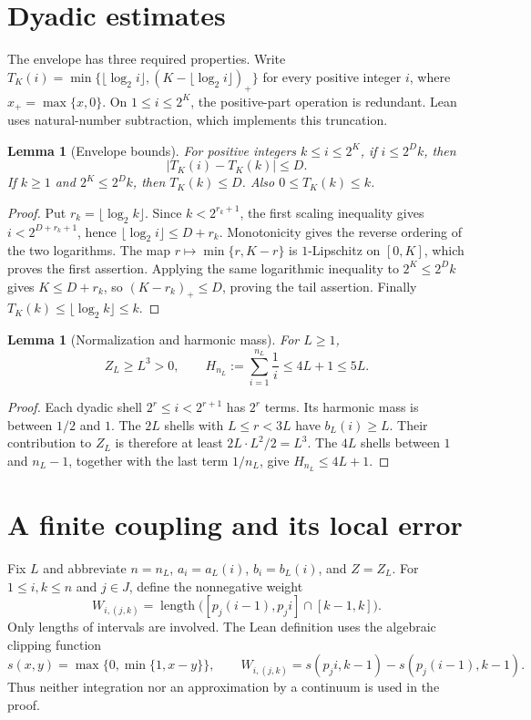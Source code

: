 \documentclass[11pt]{article}
\newtheorem{lemma}[theorem]{Lemma}
\begin{document}
\section{Dyadic estimates}

The envelope has three required properties. Write $T_K(i)=\min\{\lfloor\log_2 i\rfloor,(K-\lfloor\log_2 i\rfloor)_+\}$ for every positive integer $i$, where $x_+=\max\{x,0\}$. On $1\leq i\leq2^K$, the positive-part operation is redundant. Lean uses natural-number subtraction, which implements this truncation.

\begin{lemma}[Envelope bounds]\label{lem:tent}
For positive integers $k\leq i\leq2^K$, if $i\leq2^Dk$, then
\[
 |T_K(i)-T_K(k)|\leq D.
\]
If $k\geq1$ and $2^K\leq2^Dk$, then $T_K(k)\leq D$. Also $0\leq T_K(k)\leq k$.
\end{lemma}
\begin{proof}
Put $r_k=\lfloor\log_2 k\rfloor$. Since $k<2^{r_k+1}$, the first scaling inequality gives $i<2^{D+r_k+1}$, hence $\lfloor\log_2 i\rfloor\leq D+r_k$. Monotonicity gives the reverse ordering of the two logarithms. The map $r\mapsto\min\{r,K-r\}$ is $1$-Lipschitz on $[0,K]$, which proves the first assertion. Applying the same logarithmic inequality to $2^K\leq2^Dk$ gives $K\leq D+r_k$, so $(K-r_k)_+\leq D$, proving the tail assertion. Finally $T_K(k)\leq\lfloor\log_2 k\rfloor\leq k$.
\end{proof}

\begin{lemma}[Normalization and harmonic mass]\label{lem:norm}
For $L\geq1$,
\[
 Z_L\geq L^3>0,
 \qquad H_{n_L}:=\sum_{i=1}^{n_L}\frac1i\leq4L+1\leq5L.
\]
\end{lemma}
\begin{proof}
Each dyadic shell $2^r\leq i<2^{r+1}$ has $2^r$ terms. Its harmonic mass is between $1/2$ and $1$. The $2L$ shells with $L\leq r<3L$ have $b_L(i)\geq L$. Their contribution to $Z_L$ is therefore at least $2L\cdot L^2/2=L^3$. The $4L$ shells between $1$ and $n_L-1$, together with the last term $1/n_L$, give $H_{n_L}\leq4L+1$.
\end{proof}

\section{A finite coupling and its local error}

Fix $L$ and abbreviate $n=n_L$, $a_i=a_L(i)$, $b_i=b_L(i)$, and $Z=Z_L$. For $1\leq i,k\leq n$ and $j\in J$, define the nonnegative weight
\begin{equation}
 W_{i,(j,k)}=
 \operatorname{length}\bigl([p_j(i-1),p_ji]\cap[k-1,k]\bigr).
 \label{eq:coupling}
\end{equation}
Only lengths of intervals are involved. The Lean definition uses the algebraic clipping function
\[
 s(x,y)=\max\{0,\min\{1,x-y\}\},\qquad
 W_{i,(j,k)}=s(p_ji,k-1)-s(p_j(i-1),k-1).
\]
Thus neither integration nor an approximation by a continuum is used in the proof.
\end{document}
